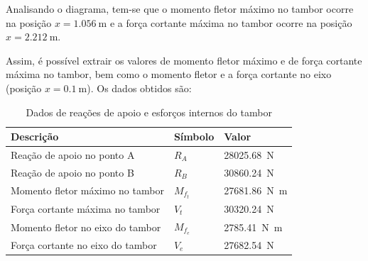 Analisando o diagrama, tem-se que o momento fletor máximo no tambor ocorre na posição $x = \SI{1.056}{\meter}$ e a força cortante máxima no tambor ocorre na posição $x = \SI{2.212}{\meter}$.

Assim, é possível extrair os valores de momento fletor máximo e de força cortante máxima no tambor, bem como o momento fletor e a força cortante no eixo (posição $x = \SI{0.1}{\meter}$). Os dados obtidos são:

\begin{table}[H]
  \centering
  \caption{Dados de reações de apoio e esforços internos do tambor}
  \label{tab:dados_esforcos_tambor}
  \begin{tabularx}{\textwidth}{>{\centering\arraybackslash}X>{\centering\arraybackslash}X>{\centering\arraybackslash}X}
    \toprule
    Descrição                        & Símbolo   & Valor                        \\
    \midrule
    Reação de apoio no ponto A       & $R_A$     & \SI{28025.68}{\newton}       \\
    Reação de apoio no ponto B       & $R_B$     & \SI{30860.24}{\newton}       \\
    Momento fletor máximo no tambor  & $M_{f_t}$ & \SI{27681.86}{\newton\meter} \\
    Força cortante máxima no tambor  & $V_t$     & \SI{30320.24}{\newton}       \\
    Momento fletor no eixo do tambor & $M_{f_e}$ & \SI{2785.41}{\newton\meter}  \\
    Força cortante no eixo do tambor & $V_e$     & \SI{27682.54}{\newton}       \\
    \bottomrule
  \end{tabularx}
\end{table}
